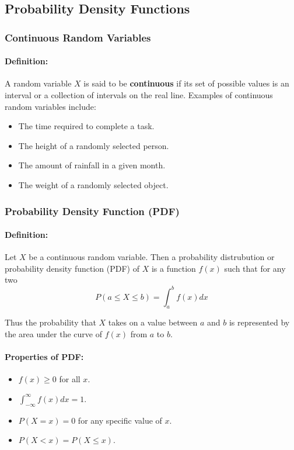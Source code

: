\subsection{Probability Density Functions}
\hrulefill
\subsubsection*{Continuous Random Variables}
\paragraph{Definition:} A random variable $X$ is said to be \textbf{continuous} if its set of possible values is 
an interval or a collection of intervals on the real line. Examples of continuous random variables include:
\begin{itemize}
    \item The time required to complete a task.
    \item The height of a randomly selected person.
    \item The amount of rainfall in a given month.
    \item The weight of a randomly selected object.
\end{itemize}

\subsubsection*{Probability Density Function (PDF)}
\paragraph{Definition:} Let $X$ be a continuous random variable. Then a probability distrubution or probability 
density function (PDF) of $X$ is a function $f(x)$ such that for any two 
\[
    P(a \leq X \leq b) = \int_{a}^b f(x) dx
\]

Thus the probability that $X$ takes on a value between $a$ and $b$ is represented by the area under the curve of $f(x)$ from $a$ to $b$. 

\paragraph{Properties of PDF:}
\begin{itemize}
    \item $f(x) \geq 0$ for all $x$.
    \item $\int_{-\infty}^{\infty} f(x) dx = 1$.
    \item $P(X = x) = 0$ for any specific value of $x$.
    \item $P(X < x) = P(X \leq x)$.
\end{itemize}

